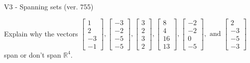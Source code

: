 \begin{exercise}
  \begin{exerciseTitle}V3 - Spanning sets (ver. 755)\end{exerciseTitle}
  \begin{exerciseStatement}
    Explain why the vectors \(\left[\begin{array}{r}
1 \\
2 \\
-3 \\
-1
\end{array}\right] , \left[\begin{array}{r}
-3 \\
-2 \\
-5 \\
-5
\end{array}\right] , \left[\begin{array}{r}
3 \\
2 \\
3 \\
2
\end{array}\right] , \left[\begin{array}{r}
8 \\
4 \\
16 \\
13
\end{array}\right] , \left[\begin{array}{r}
-2 \\
-2 \\
0 \\
-5
\end{array}\right] , \text{ and } \left[\begin{array}{r}
2 \\
-3 \\
-5 \\
-3
\end{array}\right]\) span or don't span \(\mathbb{R}^4\). 
	



\end{exerciseStatement}
\end{exercise}
